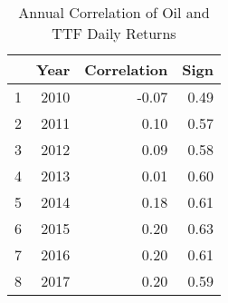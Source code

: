 \begin{table}[ht]
\centering
\begin{tabular}{rrrr}
  \hline
 & Year & Correlation & Sign \\ 
  \hline
1 & 2010 & -0.07 & 0.49 \\ 
  2 & 2011 & 0.10 & 0.57 \\ 
  3 & 2012 & 0.09 & 0.58 \\ 
  4 & 2013 & 0.01 & 0.60 \\ 
  5 & 2014 & 0.18 & 0.61 \\ 
  6 & 2015 & 0.20 & 0.63 \\ 
  7 & 2016 & 0.20 & 0.61 \\ 
  8 & 2017 & 0.20 & 0.59 \\ 
   \hline
\end{tabular}
\caption{Annual Correlation of Oil and TTF Daily Returns} 
\label{tab:oil_ttf_return_corr_annual}
\end{table}
